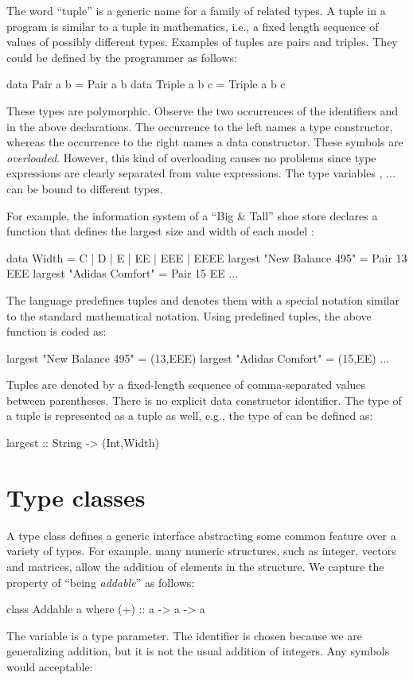 The word ``tuple'' is a generic name
for a family of related types.
A tuple in a program is similar to
a tuple in mathematics, i.e., a fixed
length sequence of values of possibly different types.
Examples of tuples are pairs and triples.
They could be defined by the programmer as follows:
%
\begin{prog}
data Pair a b = Pair a b
\medskip
data Triple a b c = Triple a b c
\end{prog}
%
These types are polymorphic.  Observe the two occurrences of
the identifiers  and  in the above declarations.
The occurrence to the left names a type constructor,
whereas the occurrence to the right names a data constructor.
These symbols are \emph{overloaded}.
However, this kind of overloading causes no problems since
type expressions are clearly separated from value expressions.
The type variables , $\ldots$ can be bound
to different types.

For example, the information system of a ``Big \& Tall'' shoe store
declares a function that defines the largest size and width of each model
:
%
\begin{prog}
data Width = C | D | E | EE | EEE | EEEE
largest "New Balance 495" = Pair 13 EEE
largest "Adidas Comfort"  = Pair 15 EE
...
\end{prog}
%
The language predefines tuples and denotes them with a special
notation similar to the standard mathematical notation.
Using predefined tuples, the above function is coded as:
%
\begin{prog}
largest "New Balance 495" = (13,EEE)
largest "Adidas Comfort"  = (15,EE)
...
\end{prog}
%
Tuples are denoted by a fixed-length sequence of comma-separated
values between parentheses.
There is no explicit data constructor identifier.
The type of a tuple is represented
as a tuple as well, e.g., the type of 
can be defined as:
%
\begin{prog}
largest :: String -> (Int,Width)
\end{prog}
%

\section{Type classes}
\label{Type classes}


A type class defines a generic interface abstracting
some common feature over a variety of types.
For example, many numeric structures, such as integer,
vectors and matrices, allow the addition of elements in the structure.
We capture the property of ``being \emph{addable}'' as follows:
%
\begin{prog}
class Addable a where
  (+) :: a ->  a  -> a
\end{prog}
%
The variable  is a type parameter.
The identifier \ccode{+} is chosen because we are generalizing
addition, but it is not the usual addition of integers.
Any symbols would acceptable:

